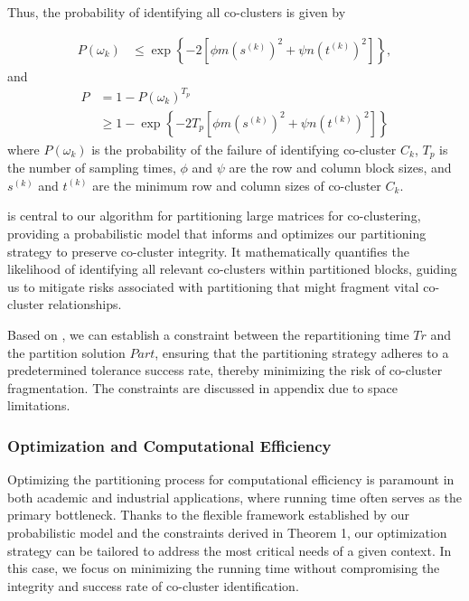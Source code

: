 \documentclass[journal]{IEEEtran}
\begin{document}
Thus, the probability of identifying all co-clusters is given by

\begin{align}
  P(\omega_k) & \le \exp \left\{ -2 [\phi m (s^{(k)})^2 + \psi n (t^{(k)})^2] \right\},
\end{align}
and
\begin{align}
  P & = 1 - P(\omega_k)^{T_p}                                                                                                       \\
    & \ge 1 - \exp \left\{ -2 T_p [\phi m (s^{(k)})^2 + \psi n (t^{(k)})^2] \right\} \label{eq:prob_of_identifying_all_co_clusters}
\end{align}
where $P(\omega_k)$ is the probability of the failure of identifying co-cluster $C_k$, $T_p$ is the number of sampling times, $\phi$ and $\psi$ are the row and column block sizes, and $s^{(k)}$ and $t^{(k)}$ are the minimum row and column sizes of co-cluster $C_k$.


 is central to our algorithm for partitioning large matrices for co-clustering, providing a probabilistic model that informs and optimizes our partitioning strategy to preserve co-cluster integrity. It mathematically quantifies the likelihood of identifying all relevant co-clusters within partitioned blocks, guiding us to mitigate risks associated with partitioning that might fragment vital co-cluster relationships.

Based on , we can establish a constraint between the repartitioning time $Tr$ and the partition solution $Part$, ensuring that the partitioning strategy adheres to a predetermined tolerance success rate, thereby minimizing the risk of co-cluster fragmentation. The constraints are discussed in appendix due to space limitations.

\subsubsection{Optimization and Computational Efficiency}
Optimizing the partitioning process for computational efficiency is paramount in both academic and industrial applications, where running time often serves as the primary bottleneck. Thanks to the flexible framework established by our probabilistic model and the constraints derived in Theorem 1, our optimization strategy can be tailored to address the most critical needs of a given context. In this case, we focus on minimizing the running time without compromising the integrity and success rate of co-cluster identification.
\end{document}
